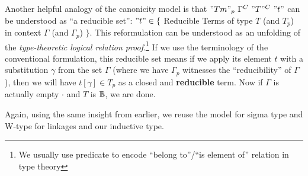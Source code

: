 Another helpful analogy of the canonicity model is that $"Tm"_p~\Gamma^C~"T"^C~"t"$ can be understood as ``a reducible set'': $"t" \in \{$ Reducible Terms of type $T$ (and $T_p$) in context $\Gamma$ (and $\Gamma_p$) $\}$. This reformulation can be understood as an unfolding of the \textit{type-theoretic logical relation proof}.\footnote{We usually use predicate to encode ``belong to''/``is element of'' relation in type theory} If we use the terminology of the conventional formulation, this reducible set means if we apply its element $t$ with a substitution $\gamma$ from the set $\Gamma$ (where we have $\Gamma_p$ witnesses the ``reducibility'' of $\Gamma$), then we will have $t[\gamma] \in T_p$ as a closed and \textbf{reducible} term. Now if $\Gamma$ is actually empty $\cdot$ and $T$ is $\mathbb{B}$, we are done. 

Again, using the same insight from earlier, we reuse the model for sigma type and W-type for linkages and our inductive type.

